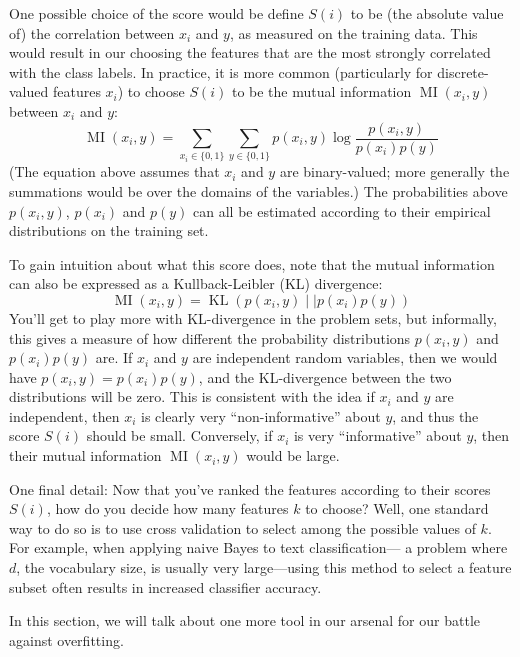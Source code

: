 One possible choice of the score would be define $S(i)$ to be (the absolute
value of) the correlation between $x_i$ and $y$, as measured on the training data.
This would result in our choosing the features that are the most strongly
correlated with the class labels. In practice, it is more common (particularly
for discrete-valued features $x_i$) to choose $S(i)$ to be the mutual information
$\operatorname{MI}(x_i ,y)$ between $x_i$ and $y$:
\begin{equation}
    \operatorname{MI}(x_i ,y) = \sum_{x_i \in \{0,1\}} \sum_{y \in \{0,1\}} p(x_i ,y)\log \frac{p(x_i ,y)}{p(x_i )p(y)}
\end{equation}
(The equation above assumes that $x_i$ and $y$ are binary-valued; more generally
the summations would be over the domains of the variables.) The
probabilities above $p(x_i ,y)$, $p(x_i )$ and $p(y)$ can all be estimated according to their
empirical distributions on the training set.

To gain intuition about what this score does, note that the mutual
information can also be expressed as a Kullback-Leibler (KL) divergence:
\begin{equation}
    \operatorname{MI}(x_i ,y) = \operatorname{KL}(p(x_i,y) \mid\mid p(x_i)p(y))
\end{equation}
You'll get to play more with KL-divergence in the problem sets, but
informally, this gives a measure of how different the probability distributions
$p(x_i ,y)$ and $p(x_i )p(y)$ are. If $x_i$ and $y$ are independent random variables,
then we would have $p(x_i ,y) = p(x_i )p(y)$, and the KL-divergence between the
two distributions will be zero. This is consistent with the idea if $x_i$ and $y$ are
independent, then $x_i$ is clearly very ``non-informative'' about $y$, and thus the
score $S(i)$ should be small. Conversely, if $x_i$ is very ``informative'' about $y$,
then their mutual information $\operatorname{MI}(x_i ,y)$ would be large.

One final detail: Now that you've ranked the features according to their
scores $S(i)$, how do you decide how many features $k$ to choose? Well, one
standard way to do so is to use cross validation to select among the possible
values of $k$. For example, when applying naive Bayes to text classification---
a problem where $d$, the vocabulary size, is usually very large---using this
method to select a feature subset often results in increased classifier accuracy.


\vspace{1cm}
In this section, we will talk about one more tool in our arsenal for our battle
against overfitting.

